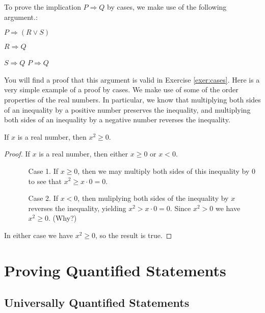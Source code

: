 To prove the implication $P\Rightarrow Q$ by cases, we make use of the following argument.: 

\setlength\linwid{5 em}
\begin{logarg}
\item $P\Rightarrow (R\lor S)$
\item $R\Rightarrow Q$
\item $S\Rightarrow Q$
\hence $P\Rightarrow Q$
\end{logarg}

You will find a proof that this argument is valid in Exercise \ref{exer:cases}.
\smallbreak
Here is a very simple example of a proof by cases. We make use of some of the order properties of the real numbers. In particular, we know that multiplying both sides of an inequality by a positive number preserves the inequality, and multiplying both sides of an inequality by a negative number reverses the inequality.

\begin{thrm}\label{thrm:squares}
If $x$ is a real number, then $x^2\geq 0$.
\end{thrm}

\begin{proof}
If $x$ is a real number, then either $x\geq 0$ or $x<0$.
\begin{itemize}
\item[]
\begin{itemize}
\item[Case 1.] If $x\geq 0$, then we may multiply both sides of this inequality by $0$ to see that $x^2\geq x\cdot 0=0$.
\item[Case 2.] If $x<0$, then muliplying both sides of the inequality by $x$ reverses the inequality, yielding $x^2>x\cdot 0=0$. Since $x^2>0$ we have $x^2\geq0$. (Why?)
\end{itemize}
\end{itemize}
In either case we have $x^2\geq 0$, so the result is true.
\end{proof}

\section{Proving Quantified Statements}

\subsection{Universally Quantified Statements}

